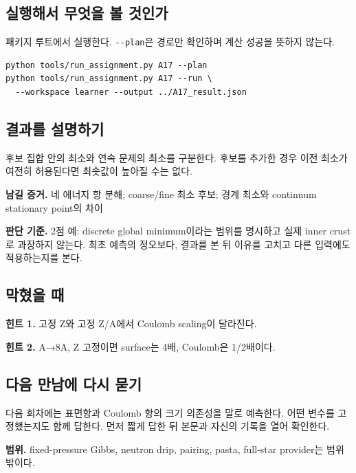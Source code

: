 \documentclass[
  10pt,
  a4paper,
]{article}
\begin{document}
\newpage

\subsection{실행해서 무엇을 볼
것인가}\label{uxc2e4uxd589uxd574uxc11c-uxbb34uxc5c7uxc744-uxbcfc-uxac83uxc778uxac00}

패키지 루트에서 실행한다. \texttt{-\/-plan}은 경로만 확인하며 계산
성공을 뜻하지 않는다.

\begin{verbatim}
python tools/run_assignment.py A17 --plan
python tools/run_assignment.py A17 --run \
  --workspace learner --output ../A17_result.json
\end{verbatim}

\subsection{결과를
설명하기}\label{uxacb0uxacfcuxb97c-uxc124uxba85uxd558uxae30}

후보 집합 안의 최소와 연속 문제의 최소를 구분한다. 후보를 추가한 경우
이전 최소가 여전히 허용된다면 최솟값이 높아질 수는 없다.

\textbf{남길 증거.} 네 에너지 항 분해; coarse/fine 최소 후보; 경계
최소와 continuum stationary point의 차이

\textbf{판단 기준.} 2점 예: discrete global minimum이라는 범위를
명시하고 실제 inner crust로 과장하지 않는다. 최초 예측의 정오보다,
결과를 본 뒤 이유를 고치고 다른 입력에도 적용하는지를 본다.

\subsection{막혔을 때}\label{uxb9c9uxd614uxc744-uxb54c}

\textbf{힌트 1.} 고정 Z와 고정 Z/A에서 Coulomb scaling이 달라진다.

\textbf{힌트 2.} A→8A, Z 고정이면 surface는 4배, Coulomb은 1/2배이다.

\subsection{다음 만남에 다시
묻기}\label{uxb2e4uxc74c-uxb9ccuxb0a8uxc5d0-uxb2e4uxc2dc-uxbb3buxae30}

다음 회차에는 표면항과 Coulomb 항의 크기 의존성을 말로 예측한다. 어떤
변수를 고정했는지도 함께 답한다. 먼저 짧게 답한 뒤 본문과 자신의 기록을
열어 확인한다.

\textbf{범위.} fixed-pressure Gibbs, neutron drip, pairing, pasta,
full-star provider는 범위 밖이다.
\end{document}
